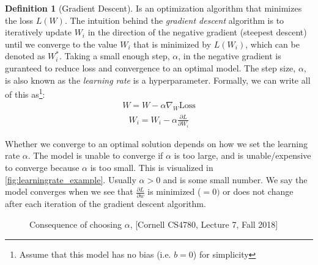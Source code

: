 \documentclass[11pt]{article}
\numberwithin{equation}{section}
\theoremstyle{definition}%
\newtheorem{definition}{Definition}[section]%
\begin{document}
\begin{definition}[Gradient Descent]
    Is an optimization algorithm that minimizes the loss $L(W)$. The intuition behind the \emph{gradient descent} algorithm is to iteratively update $W_i$ in the direction of the negative gradient (steepest descent) until we converge to the value $W_i$ that is minimized by $L(W_i)$, which can be denoted as $W_i^{\ast}$.  Taking a small enough step, $\alpha$, in the negative gradient is guranteed to reduce loss and convergence to an optimal model. The step size, $\alpha$, is also known as the \emph{learning rate} is a hyperparameter. Formally, we can write all of this as\footnote{Assume that this model has no bias (i.e. $b=0$) for simplicity}:
    \begin{align}
        W = W - \alpha \nabla_W \text{Loss}  
    \end{align}
    \begin{align}
        W_i = W_i - \alpha \frac{\partial L}{\partial W_i}  
    \end{align}
\end{definition}

Whether we converge to an optimal solution depends on how we set the learning rate $\alpha$. The model is unable to converge if $\alpha$ is too large, and is unable/expensive to converge because $\alpha$ is too small. This is visualized in \autoref{fig:learningrate_example}. Usually $\alpha > 0$ and is some small number. We say the model converges when we see that $\frac{\partial L}{\partial w}$ is minimized ($=0)$ or does not change after each iteration of the gradient descent algorithm.

\begin{figure}[h]%
    \centering
    \qquad
    \caption{Consequence of choosing $\alpha$, [Cornell CS4780, Lecture 7, Fall 2018]}%
    \label{fig:learningrate_example}%
\end{figure}
\end{document}
